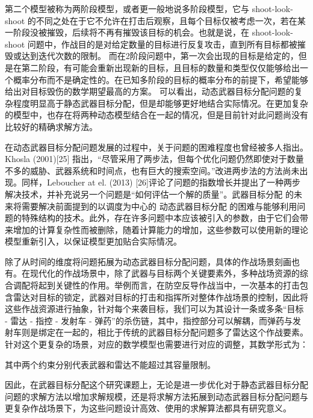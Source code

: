 第二个模型被称为两阶段模型，或者更一般地说多阶段模型，它与 shoot-look-shoot 的不同之处在于它不允许在打击后观察，且每个目标仅被考虑一次，若在某一阶段没被摧毁，后续将不再有摧毁该目标的机会。也就是说，在 shoot-look-shoot 问题中，作战目的是对给定数量的目标进行反复攻击，直到所有目标都被摧毁或达到迭代次数的限制。 而在2阶段问题中，第一次会出现的目标是给定的，但是在第二阶段，有可能会重新出现新的目标，且目标的数量和类型仅仅能够给出一个概率分布而不是确定性的。在已知多阶段的目标的概率分布的前提下，希望能够给出对目标毁伤的数学期望最高的方案。
可以看出，动态武器目标分配问题的复杂程度明显高于静态武器目标分配，但是却能够更好地结合实际情况。在更加复杂的模型中，也存在将两种动态模型结合在一起的情况，但是目前针对此问题尚没有比较好的精确求解方法。


在动态武器目标分配问题发展的过程中，关于问题的困难程度也曾经被多人指出。Khosla (2001)[25] 指出，“尽管采用了两步法，但每个优化问题仍然即使对于数量不多的威胁、武器系统和时间点，也有巨大的搜索空间。”改进两步法的方法尚未出现。同样，Leboucher at el. (2013) [26]评论了问题的指数增长并提出了一种两步解决技术，并补充说另一个问题是“如何评估一个解的质量”。武器目标分配 的未来将需要解决前面提到的以调度为中心的 动态武器目标分配 的困难与能够利用问题的特殊结构的技术。此外，存在许多问题中本应该被引入的参数，由于它们会带来增加的计算复杂性而被删除，随着计算能力的增加，这些参数可以使用新的理论模型重新引入，以保证模型更加贴合实际情况。

除了从时间的维度将问题拓展为动态武器目标分配问题，具体的作战场景刻画也有。在现代化的作战场景中，除了武器与目标两个关键要素外，多种战场资源的综合调配将起到关键性的作用。举例而言，在防空反导作战当中，一次基本的打击包含雷达对目标的锁定，武器对目标的打击和指挥所对整体作战场景的控制，因此将这些作战资源进行抽象，针对每个来袭目标，我们可以为其设计一条或多条“目标 - 雷达 - 指控 - 发射车 - 弹药”的杀伤链，其中，指控部分可以解耦，而弹药与发射车则是绑定在一起的，相比于传统的武器目标分配问题多了雷达这个作战要素。针对这个更复杂的场景，对应的数学模型也需要进行对应的调整，其数学形式为：


其中两个约束分别代表武器和雷达不能超过其容量限制。

因此，在武器目标分配这个研究课题上，无论是进一步优化对于静态武器目标分配问题的求解方法以增加求解规模，还是将求解方法拓展到动态武器目标分配问题与更复杂作战场景下，为这些问题设计高效、使用的求解算法都具有研究意义。



